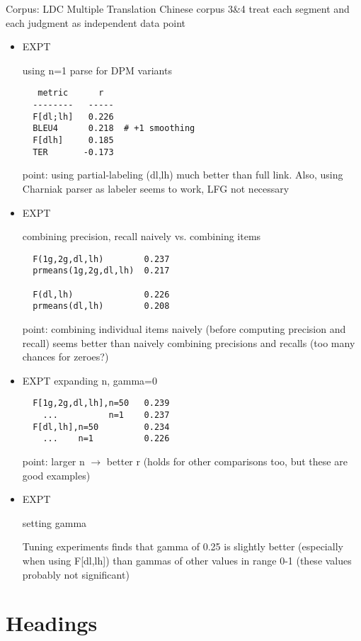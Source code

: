 \documentclass{kluwer}    %
\begin{document}
\begin{article}
Corpus: LDC Multiple Translation Chinese corpus 3\&4 treat each
segment and each judgment as independent data point

\begin{itemize}
\item EXPT

  using n=1 parse for DPM variants

\begin{verbatim}
   metric      r
  --------   -----
  F[dl;lh]   0.226
  BLEU4      0.218  # +1 smoothing
  F[dlh]     0.185
  TER       -0.173
\end{verbatim}

  point: using partial-labeling (dl,lh) much better than full
  link. Also, using Charniak parser as labeler seems to work, LFG not
  necessary

\item EXPT 

  combining precision, recall naively vs. combining items

\begin{verbatim}
  F(1g,2g,dl,lh)        0.237
  prmeans(1g,2g,dl,lh)  0.217

  F(dl,lh)              0.226
  prmeans(dl,lh)        0.208
\end{verbatim}

  point: combining individual items naively (before computing
  precision and recall) seems better than naively combining precisions
  and recalls (too many chances for zeroes?)

\item EXPT
  expanding n, gamma=0

\begin{verbatim}
  F[1g,2g,dl,lh],n=50   0.239
    ...          n=1    0.237
  F[dl,lh],n=50         0.234
    ...    n=1          0.226
\end{verbatim}
  point: larger n $\to$ better r
  (holds for other comparisons too, but these are good examples)

\item  EXPT

  setting gamma

  Tuning experiments finds that gamma of 0.25 is slightly better
  (especially when using F[dl,lh]) than gammas of other values in
  range 0-1 (these values probably not significant)


\end{itemize}

\section{Headings}


\end{article}
\end{document}
